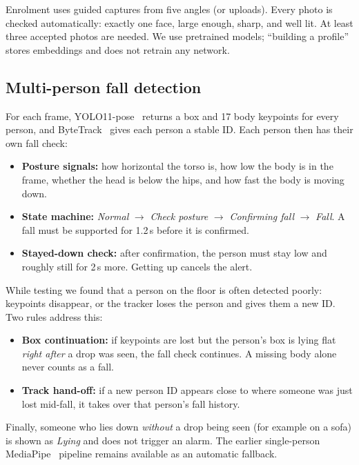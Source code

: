 \documentclass[11pt,a4paper]{article}
\begin{document}
\noindent Enrolment uses guided captures from five angles (or uploads). Every photo is checked automatically: exactly
one face, large enough, sharp, and well lit. At least three accepted photos are needed. We use pretrained models;
``building a profile'' stores embeddings and does not retrain any network.

\subsection{Multi-person fall detection}

For each frame, YOLO11-pose~\cite{yolo11} returns a box and 17 body keypoints for every person, and
ByteTrack~\cite{bytetrack} gives each person a stable ID. Each person then has their own fall check:

\begin{itemize}[leftmargin=*]
  \item \textbf{Posture signals:} how horizontal the torso is, how low the body is in the frame, whether the head is
        below the hips, and how fast the body is moving down.
  \item \textbf{State machine:} \emph{Normal} $\rightarrow$ \emph{Check posture} $\rightarrow$ \emph{Confirming fall}
        $\rightarrow$ \emph{Fall}. A fall must be supported for 1.2\,s before it is confirmed.
  \item \textbf{Stayed-down check:} after confirmation, the person must stay low and roughly still for 2\,s more.
        Getting up cancels the alert.
\end{itemize}

\noindent While testing we found that a person on the floor is often detected poorly: keypoints disappear, or the
tracker loses the person and gives them a new ID. Two rules address this:

\begin{itemize}[leftmargin=*]
  \item \textbf{Box continuation:} if keypoints are lost but the person's box is lying flat \emph{right after} a drop was
        seen, the fall check continues. A missing body alone never counts as a fall.
  \item \textbf{Track hand-off:} if a new person ID appears close to where someone was just lost mid-fall, it takes over
        that person's fall history.
\end{itemize}

\noindent Finally, someone who lies down \emph{without} a drop being seen (for example on a sofa) is shown as
\emph{Lying} and does not trigger an alarm. The earlier single-person MediaPipe~\cite{lugaresi2019} pipeline remains
available as an automatic fallback.
\end{document}
